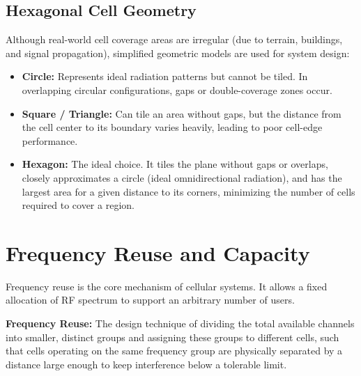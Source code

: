 \documentclass[12pt,a4paper]{article}
\begin{document}
\subsection{Hexagonal Cell Geometry}
Although real-world cell coverage areas are irregular (due to terrain, buildings, and signal propagation), simplified geometric models are used for system design:
\begin{itemize}[leftmargin=*, itemsep=3pt]
  \item \textbf{Circle:} Represents ideal radiation patterns but cannot be tiled. In overlapping circular configurations, gaps or double-coverage zones occur.
  \item \textbf{Square / Triangle:} Can tile an area without gaps, but the distance from the cell center to its boundary varies heavily, leading to poor cell-edge performance.
  \item \textbf{Hexagon:} The ideal choice. It tiles the plane without gaps or overlaps, closely approximates a circle (ideal omnidirectional radiation), and has the largest area for a given distance to its corners, minimizing the number of cells required to cover a region.
\end{itemize}

\section{Frequency Reuse and Capacity}

Frequency reuse is the core mechanism of cellular systems. It allows a fixed allocation of RF spectrum to support an arbitrary number of users.

\begin{tcolorbox}[defbox]
\textbf{Frequency Reuse:} The design technique of dividing the total available channels into smaller, distinct groups and assigning these groups to different cells, such that cells operating on the same frequency group are physically separated by a distance large enough to keep interference below a tolerable limit.
\end{tcolorbox}
\end{document}
